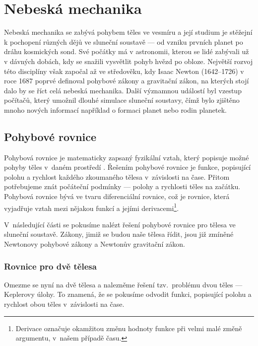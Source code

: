 \documentclass[A4paper, 12pt, oneside]{book}
\begin{document}
\chapter{Nebeská mechanika}
Nebeská mechanika se zabývá pohybem těles ve vesmíru a její studium je stěžejní k pochopení různých dějů ve sluneční soustavě --- od vzniku prvních planet po dráhu kosmických sond. Své počátky má v astronomii, kterou se lidé zabývali už v dávných dobách, kdy se snažili vysvětlit pohyb hvězd po obloze. Největší rozvoj této disciplíny však započal až ve středověku, kdy Isaac Newton (1642--1726) v roce 1687 poprvé definoval pohybové zákony a gravitační zákon, na kterých stojí dalo by se říct celá nebeská mechanika. Další významnou událostí byl vzestup počítačů, který umožnil dlouhé simulace sluneční soustavy, čímž bylo zjištěno mnoho nových informací například o formaci planet nebo rodin planetek.

\section{Pohybové rovnice}
Pohybová rovnice je matematicky zapsaný fyzikální vztah, který popisuje možné pohyby těles v~daném prostředí \cite{wiki:eqm}. Řešením pohybové rovnice je funkce, popisující polohu a rychlost každého zkoumaného tělesa v~závislosti na čase. Přitom potřebujeme znát počáteční podmínky --- polohy a rychlosti těles na začátku. Pohybová rovnice bývá ve tvaru diferenciální rovnice, což je rovnice, která vyjadřuje vztah mezi nějakou funkcí a jejími derivacemi\footnote{Derivace označuje okamžitou změnu hodnoty funkce při velmi malé změně argumentu, v~našem případě času.}.

V~následující části se pokusíme nalézt řešení pohybové rovnice pro tělesa ve sluneční soustavě. Zákony, jimiž se budou naše tělesa řídit, jsou již zmíněné Newtonovy pohybové zákony a Newtonův gravitační zákon.
\subsection{Rovnice pro dvě tělesa} \label{sec:2body}
Omezme se nyní na dvě tělesa a nalezněme řešení tzv.\ problému dvou těles --- Keplerovy úlohy. To znamená, že se pokusíme odvodit funkci, popisující polohu a rychlost obou těles v~závislosti na čase. 
\end{document}
